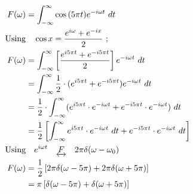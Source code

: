 \documentclass[preview]{standalone}
\begin{document}
\begin{align*}
F(\omega)&=\int_{-\infty}^{\infty} \cos{(5\pi t)} e^{-i\omega t} \ dt \\ \textrm{Using}& \quad \cos{x}=\frac{e^{i\omega}+e^{-ix}}{2} \ ; \\ F(\omega)&=\int_{-\infty}^{\infty}\left[ \frac{e^{i5\pi t}+e^{-i5\pi t}}{2}\right] e^{-i\omega t} \ dt \\ &=\int_{-\infty}^{\infty} \frac{1}{2}\cdot (e^{i5\pi t}+e^{-i5\pi t})e^{-i\omega t} \ dt \\ &=\frac{1}{2}\cdot \int_{-\infty}^{\infty}(e^{i5\pi t}\cdot e^{-i\omega t}+e^{-i5\pi t}\cdot e^{-i\omega t}) \ dt \\ &=\frac{1}{2}\left[ \int_{-\infty}^{\infty}e^{i5\pi t}\cdot e^{-i\omega t} \ dt+e^{-i5\pi t}\cdot e^{-i\omega t} \ dt \right] \\ \textrm{Using}& \quad e^{i\omega t} \quad \underleftrightarrow{F} \quad 2\pi \delta(\omega - \omega_{0}) \\ F(\omega)&=\frac{1}{2}\left[ 2\pi \delta(\omega-5\pi)+2\pi\delta(\omega+5\pi) \right] \\ &=\pi\left[\delta(\omega-5\pi)+\delta(\omega+5\pi)\right]
\end{align*}
\end{document}
